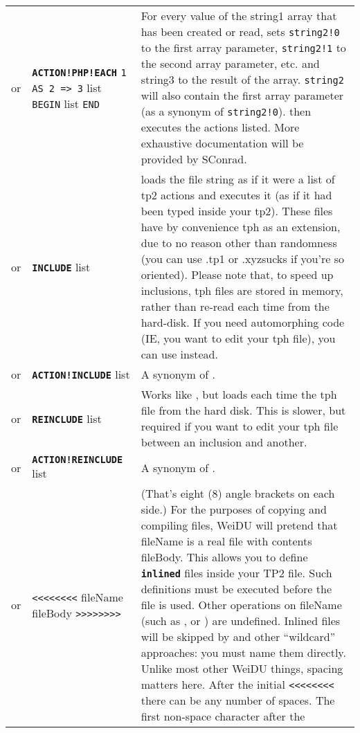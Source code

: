 \documentclass{article}
\def\ttref#1{\ahrefloc{#1}{\tt #1}}
\def\DEFINE#1{{\tt \bf #1}\label{#1}\index{#1}}
\def\t#1{{\tt #1}}
\def\Slist{{\color{red} list }}
\begin{document}
\begin{tabular}{cp{10in}|p{10in}}
or & \DEFINE{ACTION!PHP!EACH} \t{\ttref{String}1 AS \ttref{String}2 => \ttref{String}3} \Slist
                              \t{BEGIN} \ttref{TP2 Action} \Slist \t{END} &
    For every value of the string1 array that has been created or read, sets
    \verb+string2!0+ to the first array parameter, \verb+string2!1+ to the second array
    parameter, etc. and string3 to the result of the array. \verb+string2+ will also contain
		the first array parameter (as a synonym of \verb+string2!0+). then executes the
    actions listed. More exhaustive documentation will be provided by SConrad.
\\

or & \DEFINE{INCLUDE} \t{\ttref{String}} \Slist &
    loads the file string as if it were a list of tp2 actions and executes it (as if
		it had been typed inside your tp2).
    These files have by convenience tph as an extension, due to no reason other than
    randomness (you can use .tp1 or .xyzsucks if you're so oriented).
		Please note that, to speed up inclusions, tph files are stored in memory,
	  rather than re-read each time from the hard-disk. If you need automorphing code
		(IE, you want to edit your tph file), you can use \ttref{REINCLUDE} instead. \\
or & \DEFINE{ACTION!INCLUDE} \t{\ttref{String}} \Slist &
    A synonym of \ttref{INCLUDE}.
\\
or & \DEFINE{REINCLUDE} \t{\ttref{String}} \Slist &
    Works like \ttref{INCLUDE}, but loads each time the tph file from the hard disk.
    This is slower, but required if you want to edit your tph file between an
    inclusion and another.
    \\
or & \DEFINE{ACTION!REINCLUDE} \t{\ttref{String}} \Slist &
    A synonym of \ttref{REINCLUDE}.
    \\
  or & \t{<<<<<<<<} fileName fileBody \t{>>>>>>>>} &
    (That's eight (8) angle brackets on each side.)
    For the purposes of copying and compiling files, WeiDU will pretend
    that fileName is a real file with contents fileBody. This allows you to
    define \DEFINE{inlined} files inside your TP2 file. Such definitions
    must be executed before the \ttref{inlined} file is used. Other operations
    on fileName (such as \ttref{FILE!EXISTS}, \ttref{FILE!MD5} or
    \ttref{FILE!SIZE}) are undefined. Inlined files will be skipped by
    \ttref{COPY!EXISTING!REGEXP} and other ``wildcard'' approaches: you
    must name them directly. Unlike most other WeiDU things,
    spacing matters here. After the initial \t{<<<<<<<<} there can be
    any number of spaces. The first non-space character after the

\end{tabular}
\end{document}
